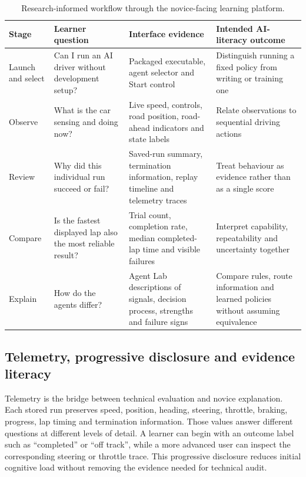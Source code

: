 \begin{table}[htbp]
  \centering
  \caption{Research-informed workflow through the novice-facing learning platform.}
  \label{tab:novice-workflow}
  \small
  \begin{tabularx}{\textwidth}{p{}p{}YY}
    \toprule
    Stage & Learner question & Interface evidence & Intended AI-literacy outcome \\
    \midrule
    Launch and select & Can I run an AI driver without development setup? & Packaged executable, agent selector and Start control & Distinguish running a fixed policy from writing or training one \\
    Observe & What is the car sensing and doing now? & Live speed, controls, road position, road-ahead indicators and state labels & Relate observations to sequential driving actions \\
    Review & Why did this individual run succeed or fail? & Saved-run summary, termination information, replay timeline and telemetry traces & Treat behaviour as evidence rather than as a single score \\
    Compare & Is the fastest displayed lap also the most reliable result? & Trial count, completion rate, median completed-lap time and visible failures & Interpret capability, repeatability and uncertainty together \\
    Explain & How do the agents differ? & Agent Lab descriptions of signals, decision process, strengths and failure signs & Compare rules, route information and learned policies without assuming equivalence \\
    \bottomrule
  \end{tabularx}
\end{table}

\subsection{Telemetry, progressive disclosure and evidence literacy}

Telemetry is the bridge between technical evaluation and novice explanation. Each stored run preserves speed, position, heading, steering, throttle, braking, progress, lap timing and termination information. Those values answer different questions at different levels of detail. A learner can begin with an outcome label such as \enquote{completed} or \enquote{off track}, while a more advanced user can inspect the corresponding steering or throttle trace. This progressive disclosure reduces initial cognitive load without removing the evidence needed for technical audit.

